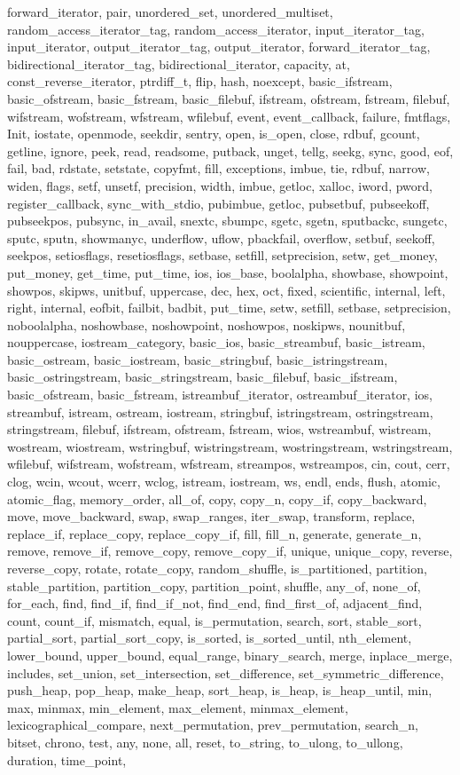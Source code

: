 {{forward_iterator, pair, unordered_set, unordered_multiset, random_access_iterator_tag, random_access_iterator, input_iterator_tag, input_iterator, output_iterator_tag, output_iterator, forward_iterator_tag, bidirectional_iterator_tag, bidirectional_iterator, capacity, at, const_reverse_iterator, ptrdiff_t, flip, hash, noexcept, basic_ifstream, basic_ofstream, basic_fstream, basic_filebuf, ifstream, ofstream, fstream, filebuf, wifstream, wofstream, wfstream, wfilebuf, event, event_callback, failure, fmtflags, Init, iostate, openmode, seekdir, sentry, open, is_open, close, rdbuf, gcount, getline, ignore, peek, read, readsome, putback, unget, tellg, seekg, sync, good, eof, fail, bad, rdstate, setstate, copyfmt, fill, exceptions, imbue, tie, rdbuf, narrow, widen, flags, setf, unsetf, precision, width, imbue, getloc, xalloc, iword, pword, register_callback, sync_with_stdio, pubimbue, getloc, pubsetbuf, pubseekoff, pubseekpos, pubsync, in_avail, snextc, sbumpc, sgetc, sgetn, sputbackc, sungetc, sputc, sputn, showmanyc, underflow, uflow, pbackfail, overflow, setbuf, seekoff, seekpos, setiosflags, resetiosflags, setbase, setfill, setprecision, setw, get_money, put_money, get_time, put_time, ios, ios_base, boolalpha, showbase, showpoint, showpos, skipws, unitbuf, uppercase, dec, hex, oct, fixed, scientific, internal, left, right, internal, eofbit, failbit, badbit, put_time, setw, setfill, setbase, setprecision, noboolalpha, noshowbase, noshowpoint, noshowpos, noskipws, nounitbuf, nouppercase, iostream_category, basic_ios, basic_streambuf, basic_istream, basic_ostream, basic_iostream, basic_stringbuf, basic_istringstream, basic_ostringstream, basic_stringstream, basic_filebuf, basic_ifstream, basic_ofstream, basic_fstream, istreambuf_iterator, ostreambuf_iterator, ios, streambuf, istream, ostream, iostream, stringbuf, istringstream, ostringstream, stringstream, filebuf, ifstream, ofstream, fstream, wios, wstreambuf, wistream, wostream, wiostream, wstringbuf, wistringstream, wostringstream, wstringstream, wfilebuf, wifstream, wofstream, wfstream, streampos, wstreampos, cin, cout, cerr, clog, wcin, wcout, wcerr, wclog, istream, iostream, ws, endl, ends, flush, atomic, atomic_flag, memory_order, all_of, copy, copy_n, copy_if, copy_backward, move, move_backward, swap, swap_ranges, iter_swap, transform, replace, replace_if, replace_copy, replace_copy_if, fill, fill_n, generate, generate_n, remove, remove_if, remove_copy, remove_copy_if, unique, unique_copy, reverse, reverse_copy, rotate, rotate_copy, random_shuffle, is_partitioned, partition, stable_partition, partition_copy, partition_point, shuffle, any_of, none_of, for_each, find, find_if, find_if_not, find_end, find_first_of, adjacent_find, count, count_if, mismatch, equal, is_permutation, search, sort, stable_sort, partial_sort, partial_sort_copy, is_sorted, is_sorted_until, nth_element, lower_bound, upper_bound, equal_range, binary_search, merge, inplace_merge, includes, set_union, set_intersection, set_difference, set_symmetric_difference, push_heap, pop_heap, make_heap, sort_heap, is_heap, is_heap_until, min, max, minmax, min_element, max_element, minmax_element, lexicographical_compare, next_permutation, prev_permutation, search_n, bitset, chrono, test, any, none, all, reset, to_string, to_ulong, to_ullong, duration, time_point, }}
